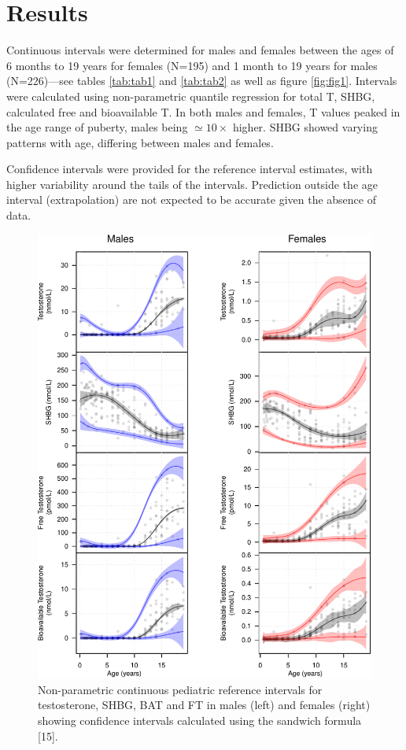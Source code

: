 \documentclass[]{elsarticle} %
\begin{document}
\hypertarget{results}{%
\section{Results}\label{results}}

Continuous intervals were determined for males and females between the
ages of 6 months to 19 years for females (N=195) and 1 month to 19 years
for males (N=226)---see tables \ref{tab:tab1} and \ref{tab:tab2} as well
as figure \ref{fig:fig1}. Intervals were calculated using non-parametric
quantile regression for total T, SHBG, calculated free and bioavailable
T. In both males and females, T values peaked in the age range of
puberty, males being \(\simeq 10 \times\) higher. SHBG showed varying
patterns with age, differing between males and females.

Confidence intervals were provided for the reference interval estimates,
with higher variability around the tails of the intervals. Prediction
outside the age interval (extrapolation) are not expected to be accurate
given the absence of data.

\begin{figure}[H]
\includegraphics{quantregfitsfig2-1} \caption{\label{fig:fig2}Non-parametric continuous pediatric reference intervals for testosterone, SHBG, BAT and FT in males (left) and females (right) showing confidence intervals calculated using the sandwich formula [15].}\label{fig:quantregfitsfig2}
\end{figure}
\end{document}
